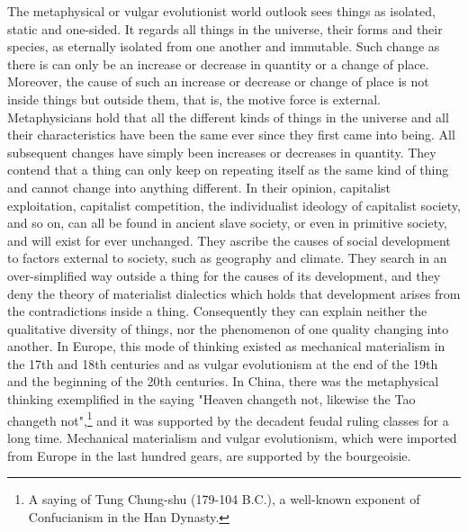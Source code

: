 \documentclass{article}
\begin{document}
The metaphysical or vulgar evolutionist world outlook sees things as
isolated, static and one-sided. It regards all things in the universe,
their forms and their species, as eternally isolated from one another and
immutable. Such change as there is can only be an increase or decrease in
quantity or a change of place. Moreover, the cause of such an increase or
decrease or change of place is not inside things but outside them, that
is, the motive force is external. Metaphysicians hold that all the
different kinds of things in the universe and all their characteristics
have been the same ever since they first came into being. All subsequent
changes have simply been increases or decreases in quantity. They contend
that a thing can only keep on repeating itself as the same kind of thing
and cannot change into anything different. In their opinion, capitalist
exploitation, capitalist competition, the individualist ideology of
capitalist society, and so on, can all be found in ancient slave society,
or even in primitive society, and will exist for ever unchanged. They
ascribe the causes of social development to factors external to society,
such as geography and climate. They search in an over-simplified way
outside a thing for the causes of its development, and they deny the
theory of materialist dialectics which holds that development arises from
the contradictions inside a thing. Consequently they can explain neither
the qualitative diversity of things, nor the phenomenon of one quality
changing into another. In Europe, this mode of thinking existed as
mechanical materialism in the 17th and 18th centuries and as vulgar
evolutionism at the end of the 19th and the beginning of the 20th
centuries. In China, there was the metaphysical thinking exemplified in
the saying "Heaven changeth not, likewise the Tao changeth not",\footnote{A saying of Tung Chung-shu (179-104 B.C.), a well-known exponent of Confucianism in the Han Dynasty.} and
it was supported by the decadent feudal ruling classes for a long time.
Mechanical materialism and vulgar evolutionism, which were imported from
Europe in the last hundred gears, are supported by the bourgeoisie.
\end{document}
